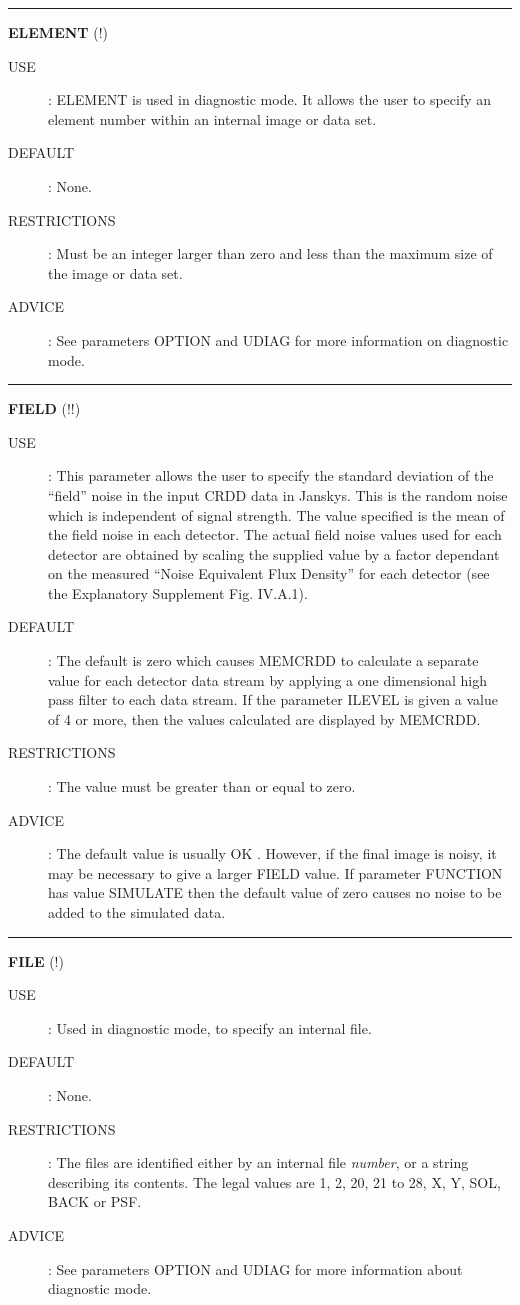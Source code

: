 \rule{\textwidth}{0.3mm}
{\Large {\bf ELEMENT} (!)}
\begin{description}
\item [USE]:
ELEMENT is used in diagnostic mode. It allows the user to specify an element
number within an internal image or data set.
\item [DEFAULT]:
None.
\item [RESTRICTIONS]:
Must be an integer larger than zero and less than the maximum size of the image
or data set.
\item [ADVICE]:
See parameters OPTION and UDIAG for more information on diagnostic mode.
\end {description}

\rule{\textwidth}{0.3mm}
{\Large {\bf FIELD} (!!)}
\begin{description}
\item [USE]:
This parameter allows the user to specify the standard deviation of the
``field'' noise in the input CRDD data in Janskys. This is the random noise
which is independent of signal strength. The value specified is the mean of the
field noise in each detector. The actual field noise values used for each
detector are obtained by scaling the supplied value by a factor dependant on the
measured ``Noise Equivalent Flux Density'' for each detector (see the
Explanatory Supplement Fig. IV.A.1).
\item [DEFAULT]:
The default is zero which causes MEMCRDD to calculate a separate value
for each detector data stream by applying a one dimensional high pass filter
to each data stream. If the parameter ILEVEL is given a value of 4 or more, then
the values calculated are displayed by MEMCRDD.
\item [RESTRICTIONS]:
The value must be greater than or equal to zero.
\item [ADVICE]:
The default value is usually OK . However, if the final image is noisy, it may
be necessary to give a larger FIELD value. If parameter FUNCTION has value
SIMULATE then the default value of zero causes no noise to be added to the
simulated data.
\end {description}

\rule{\textwidth}{0.3mm}
{\Large {\bf FILE} (!)}
\begin{description}
\item [USE]:
Used in diagnostic mode, to specify an internal file.
\item [DEFAULT]:
None.
\item [RESTRICTIONS]:
The files are identified either by an internal file {\em number}, or a string
describing its contents. The legal values are 1, 2, 20, 21 to 28, X, Y, SOL,
BACK or PSF.
\item [ADVICE]:
See parameters OPTION and UDIAG for more information about diagnostic mode.
\end {description}

